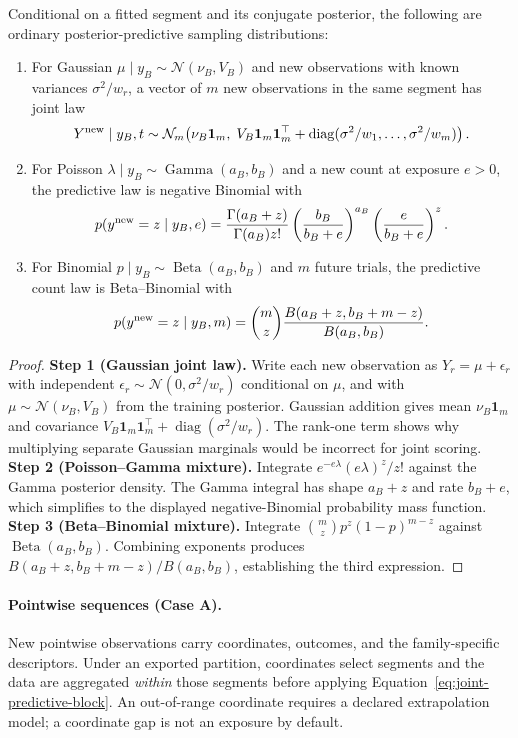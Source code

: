 \begin{corollary}
\label{cor:predictive-families-paper}
Conditional on a fitted segment and its conjugate posterior, the following are ordinary posterior-predictive sampling distributions:
\begin{enumerate}
\item For Gaussian $\mu\mid y_B\sim\mathcal N(\nu_B,V_B)$ and new observations with known variances $\sigma^2/w_r$, a vector of $m$ new observations in the same segment has joint law
\[
Y^{\rm new}\mid y_B,t\sim\mathcal N_m\!\left(\nu_B\mathbf1_m,\;V_B\mathbf1_m\mathbf1_m^\top+\operatorname{diag}(\sigma^2/w_1,\ldots,\sigma^2/w_m)\right).
\]
\item For Poisson $\lambda\mid y_B\sim\operatorname{Gamma}(a_B,b_B)$ and a new count at exposure $e>0$, the predictive law is negative Binomial with
\[
p(y^{\rm new}=z\mid y_B,e)=\frac{\Gamma(a_B+z)}{\Gamma(a_B)z!}\left(\frac{b_B}{b_B+e}\right)^{a_B}\left(\frac{e}{b_B+e}\right)^z.
\]
\item For Binomial $p\mid y_B\sim\operatorname{Beta}(a_B,b_B)$ and $m$ future trials, the predictive count law is Beta--Binomial with
\[
p(y^{\rm new}=z\mid y_B,m)=\binom mz\frac{B(a_B+z,b_B+m-z)}{B(a_B,b_B)}.
\]
\end{enumerate}
\end{corollary}
\begin{proof}
\textbf{Step 1 (Gaussian joint law).}
Write each new observation as $Y_r=\mu+\epsilon_r$ with independent $\epsilon_r\sim\mathcal N(0,\sigma^2/w_r)$ conditional on $\mu$, and with $\mu\sim\mathcal N(\nu_B,V_B)$ from the training posterior. Gaussian addition gives mean $\nu_B\mathbf1_m$ and covariance $V_B\mathbf1_m\mathbf1_m^\top+\operatorname{diag}(\sigma^2/w_r)$. The rank-one term shows why multiplying separate Gaussian marginals would be incorrect for joint scoring.
\textbf{Step 2 (Poisson--Gamma mixture).}
Integrate $e^{-e\lambda}(e\lambda)^z/z!$ against the Gamma posterior density. The Gamma integral has shape $a_B+z$ and rate $b_B+e$, which simplifies to the displayed negative-Binomial probability mass function.
\textbf{Step 3 (Beta--Binomial mixture).}
Integrate $\binom mzp^z(1-p)^{m-z}$ against $\operatorname{Beta}(a_B,b_B)$. Combining exponents produces $B(a_B+z,b_B+m-z)/B(a_B,b_B)$, establishing the third expression.
\end{proof}

\paragraph{Pointwise sequences (Case A).}
New pointwise observations carry coordinates, outcomes, and the family-specific descriptors. Under an exported partition, coordinates select segments and the data are aggregated \emph{within} those segments before applying Equation~\eqref{eq:joint-predictive-block}. An out-of-range coordinate requires a declared extrapolation model; a coordinate gap is not an exposure by default.

